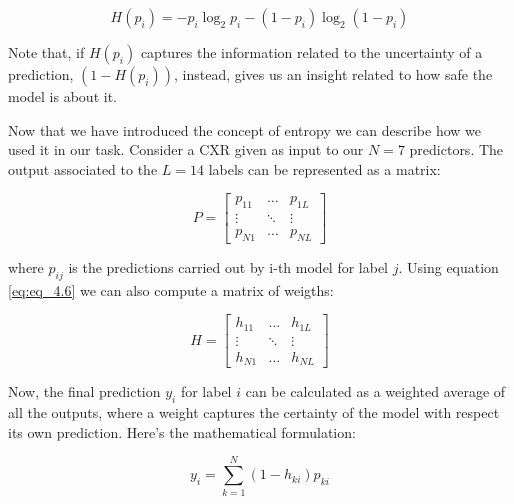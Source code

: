 \begin{equation}
    H(p_{i}) = - p_{i} \log _{2}p_{i} - \left(1-p_{i} \right) \log _{2}\left( 1-p_{i} \right)
    \label{eq:eq_4.6}
\end{equation}

\noindent Note that, if $H(p_{i})$ captures the information related to the uncertainty of a prediction, $(1-H(p_{i}))$, instead, gives us an insight related to how safe the model is about it.

\noindent Now that we have introduced the concept of entropy we can describe how we used it in our task. Consider a \ac{CXR} given as input to our $N=7$ predictors. The output associated to the $L=14$ labels can be represented as a matrix: 

\begin{equation}
P =
\begin{bmatrix} 
    p_{11} & \dots & p_{1L} \\
    \vdots & \ddots & \vdots\\
    p_{N1} &  \dots      & p_{NL} 
\end{bmatrix}
\label{eq:eq_4.7}
\end{equation}

\noindent where $p_{ij}$ is the predictions carried out by i-th model for label $j$. Using equation \ref{eq:eq_4.6} we can also compute a matrix of weigths:

\begin{equation}
H =
\begin{bmatrix} 
    h_{11} & \dots & h_{1L} \\
    \vdots & \ddots & \vdots\\
    h_{N1} &  \dots      & h_{NL} 
\end{bmatrix}
\label{eq:eq_4.8}
\end{equation}

\vspace{4mm}

\noindent Now, the final prediction $y_{i}$ for label $i$ can be calculated as a weighted average of all the outputs, where a weight captures the certainty of the model with respect its own prediction. Here's the mathematical formulation: 

\begin{equation}
y_{i} = \sum _{k=1}^{N} \left(1- h_{ki} \right)p_{ki}
\label{eq:eq_4.9}
\end{equation}

\vspace{7mm}

